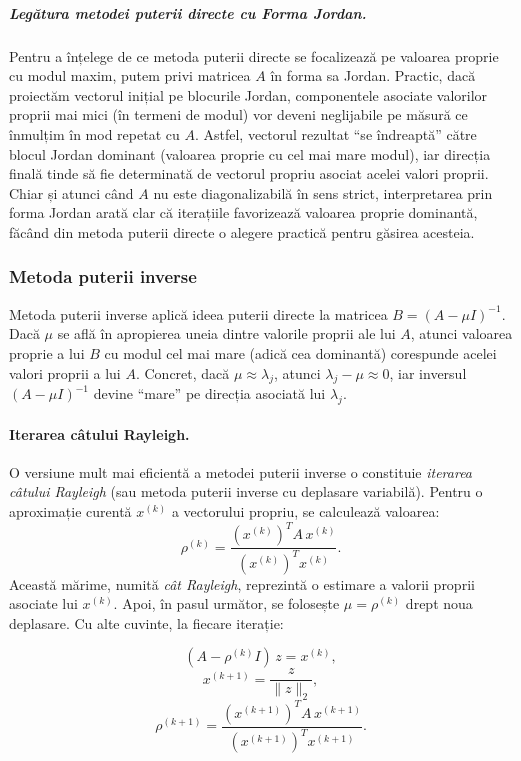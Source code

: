 \documentclass{exam}
\begin{document}
\subparagraph{Legătura metodei puterii directe cu Forma Jordan.}  
Pentru a înțelege de ce metoda puterii directe se focalizează pe valoarea proprie cu modul maxim, putem privi matricea $A$ în forma sa Jordan. Practic, dacă proiectăm vectorul inițial pe blocurile Jordan, componentele asociate valorilor proprii mai mici (în termeni de modul) vor deveni neglijabile pe măsură ce înmulțim în mod repetat cu $A$. Astfel, vectorul rezultat “se îndreaptă” către blocul Jordan dominant (valoarea proprie cu cel mai mare modul), iar direcția finală tinde să fie determinată de vectorul propriu asociat acelei valori proprii. Chiar și atunci când $A$ nu este diagonalizabilă în sens strict, interpretarea prin forma Jordan arată clar că iterațiile favorizează valoarea proprie dominantă, făcând din metoda puterii directe o alegere practică pentru găsirea acesteia.

\subsubsection{Metoda puterii inverse}

Metoda puterii inverse aplică ideea puterii directe la matricea $B = (A - \mu I)^{-1}$. Dacă $\mu$ se află în apropierea uneia dintre valorile proprii ale lui $A$, atunci valoarea proprie a lui $B$ cu modul cel mai mare (adică cea dominantă) corespunde acelei valori proprii a lui $A$. Concret, dacă $\mu \approx \lambda_j$, atunci $\lambda_j - \mu \approx 0$, iar inversul $(A - \mu I)^{-1}$ devine “mare” pe direcția asociată lui $\lambda_j$. 

\paragraph{Iterarea câtului Rayleigh.}  
O versiune mult mai eficientă a metodei puterii inverse o constituie \emph{iterarea câtului Rayleigh} (sau metoda puterii inverse cu deplasare variabilă). Pentru o aproximație curentă $x^{(k)}$ a vectorului propriu, se calculează valoarea:
\[
	\rho^{(k)} = \frac{(x^{(k)})^T A \, x^{(k)}}{(x^{(k)})^T x^{(k)}}.
\]
Această mărime, numită \emph{cât Rayleigh}, reprezintă o estimare a valorii proprii asociate lui $x^{(k)}$. Apoi, în pasul următor, se folosește $\mu = \rho^{(k)}$ drept noua deplasare. Cu alte cuvinte, la fiecare iterație:

\[
	(A - \rho^{(k)} I)\, z = x^{(k)}, 
\]
\[
	x^{(k+1)} = \frac{z}{\|z\|_2},
\]
\[
	\rho^{(k+1)} = \frac{(x^{(k+1)})^T A \, x^{(k+1)}}{(x^{(k+1)})^T x^{(k+1)}}.
\]
\end{document}
